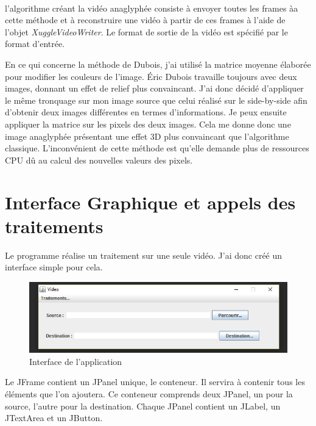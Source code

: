\documentclass[10pt,a4paper]{article}
\begin{document}

~~\\

l'algorithme créant la vidéo anaglyphée consiste à envoyer toutes les frames àa cette méthode et à reconstruire une vidéo à partir de ces frames à l'aide de l'objet
\textit{XuggleVideoWriter}. Le format de sortie de la vidéo est spécifié par le format d'entrée.

En ce qui concerne la méthode de Dubois, j'ai utilisé la matrice moyenne élaborée pour modifier les couleurs de l'image. Éric Dubois travaille toujours avec deux images, donnant un effet de relief plus
convaincant. J'ai donc décidé d'appliquer le même tronquage sur mon image source que celui réalisé sur le side-by-side afin d'obtenir deux images différentes en termes d'informations. Je peux ensuite
appliquer la matrice sur les pixels des deux images. Cela me donne donc une image anaglyphée présentant une effet 3D plus convaincant que l'algorithme classique. L'inconvénient de cette méthode est
qu'elle demande plus de ressources CPU dû au calcul des nouvelles valeurs des pixels.


\section{Interface Graphique et appels des traitements}

Le programme réalise un traitement sur une seule vidéo. J'ai donc créé un interface simple pour cela.

\begin{figure}[!h]
\center
\includegraphics[scale = 0.8]{interface.PNG}
\caption{Interface de l'application}
\end{figure}

Le JFrame contient un JPanel unique, le conteneur. Il servira à contenir tous les éléments que l'on ajoutera. Ce conteneur comprends deux JPanel, un pour la source, l'autre pour la destination.
Chaque JPanel contient un JLabel, un JTextArea et un JButton.
\end{document}
